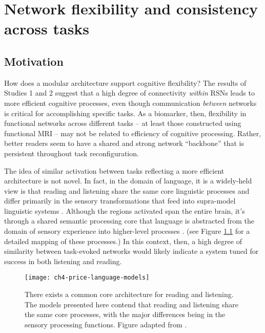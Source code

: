 \chapter{Network flexibility and consistency across tasks}

\section{Motivation}

How does a modular architecture support cognitive flexibility? The results of Studies 1 and 2 suggest that a high degree of connectivity \textit{within} RSNs leads to more efficient cognitive processes, even though communication \textit{between} networks is critical for accomplishing specific tasks. As a biomarker, then, flexibility in functional networks across different tasks -- at least those constructed using functional MRI --  may not be related to efficiency of cognitive processing. Rather, better readers seem to have a shared and strong network ``backbone'' that is persistent throughout task reconfiguration. 

The idea of similar activation between tasks reflecting a more efficient architecture is not novel. In fact, in the domain of language, it is a widely-held view is that reading and listening share the same core linguistic processes and differ primarily in the sensory transformations that feed into supra-model linguistic systems \citep{Mattingly1971}. Although the regions activated span the entire brain, it's through a shared semantic processing core that language is abstracted from the domain of sensory experience into higher-level processes \citep{Price2012}. (see Figure \ref{fig:ch4-price-language-models} for a detailed mapping of these processes.) In this context, then, a high degree of similarity between task-evoked networks would likely indicate a system tuned for success in both listening and reading.

\begin{figure}[t]
	\centering
	\texttt{[image: ch4-price-language-models]}
    \caption[Common core architecture for reading and listening]{There exists a common core architecture for reading and listening. The models presented here contend that reading and listening share the same core processes, with the major differences being in the sensory processing functions. Figure adapted from \citep{Price2012}.}
	\label{fig:ch4-price-language-models}
\end{figure}

